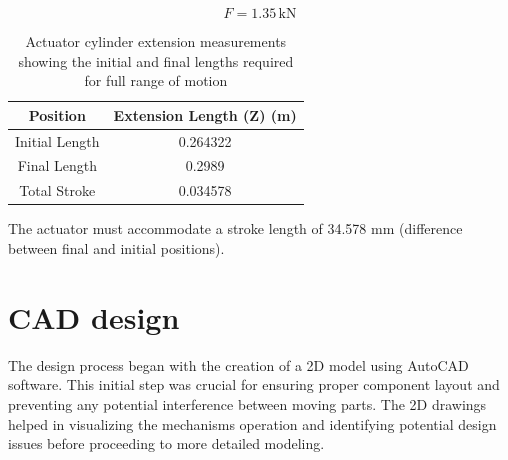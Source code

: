 \documentclass[../../main]{subfiles}
\begin{document}
\[
    F = 1.35 \, \text{kN}
\]
\begin{table}[h!]
  \centering
  \begin{tabular}{|c|c|}
      \hline \rowcolor{red!20}
      \textbf{Position} & \textbf{Extension Length (Z) (m)} \\ \hline
      Initial Length & 0.264322 \\ \hline
      Final Length & 0.2989 \\ \hline
      Total Stroke & 0.034578 \\ \hline
  \end{tabular}
  \caption[Actuator Cylinder Measurements]{Actuator cylinder extension measurements showing the initial and final lengths required for full range of motion}
  \label{tab:extension_length}
\end{table}

The actuator must accommodate a stroke length of 34.578 mm (difference
between final and initial positions).

\section{CAD design}

The design process began with the creation of a 2D model using AutoCAD
software. This initial step was crucial for ensuring proper component
layout and preventing any potential interference between moving parts.
The 2D drawings helped in visualizing the mechanism\textquotesingle s
operation and identifying potential design issues before proceeding to
more detailed modeling.
\end{document}
